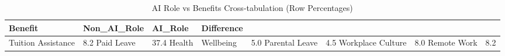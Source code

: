 \begin{table}[!htbp] \centering
\caption{AI Role vs Benefits Cross-tabulation (Row Percentages)}
\label{tab:ai_benefits_crosstab}
\begin{tabular}{llll}
\hline
Benefit & Non_AI_Role & AI_Role & Difference \\
\hline
Tuition Assistance & 8.2%
Paid Leave & 37.4%
Health & Wellbeing & 5.0%
Parental Leave & 4.5%
Workplace Culture & 8.0%
Remote Work & 8.2%
\hline
\end{tabular}
\end{table}
